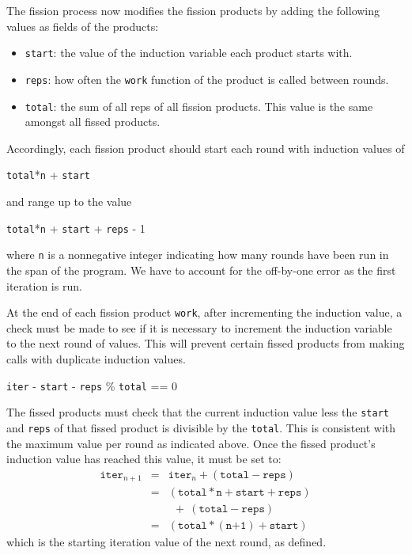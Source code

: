 The fission process now modifies the fission products by adding the
following values as fields of the products:
\begin{itemize}
    \item \texttt{start}: the value of the induction variable each product starts with.
    \item \texttt{reps}: how often the \texttt{work} function of the product is
      called between rounds.
    \item \texttt{total}: the sum of all reps of all fission products. This value is
      the same amongst all fissed products.
\end{itemize}
Accordingly, each fission product should start each round with induction values
of
\begin{center}
\texttt{total}*\texttt{n} + \texttt{start}
\end{center}
and range up to the value
\begin{center}
\texttt{total}*\texttt{n} + \texttt{start} + \texttt{reps} - 1
\end{center}
where \texttt{n} is a nonnegative integer indicating how many rounds have
been run in the span of the program.  We have to account for the off-by-one
error as the first iteration is run.

At the end of each fission product \texttt{work}, after incrementing the
induction value, a check must be made to see if it is necessary to increment
the induction variable to the next round of  values.  This will prevent certain
fissed products from making calls with duplicate induction values.
\begin{center}
\texttt{iter} - \texttt{start} - \texttt{reps} \% \texttt{total} == 0
\end{center}
The fissed products must check that the current induction value less the
\texttt{start} and \texttt{reps} of that fissed product is divisible by the
\texttt{total}.  This is consistent with the maximum value per round as
indicated above.  Once the fissed product's induction value has reached
this value, it must be set to:
\begin{eqnarray*}
\texttt{iter}_{n+1} &=& \texttt{iter}_{n} + (\texttt{total} - \texttt{reps}) \\
&=& (\texttt{total}*\texttt{n} + \texttt{start} + \texttt{reps}) \\
&&  \ \ +\ (\texttt{total} - \texttt{reps}) \\
&=& (\texttt{total}*(\texttt{n+1}) + \texttt{start})
\end{eqnarray*}
which is the starting iteration value of the next round, as defined.

